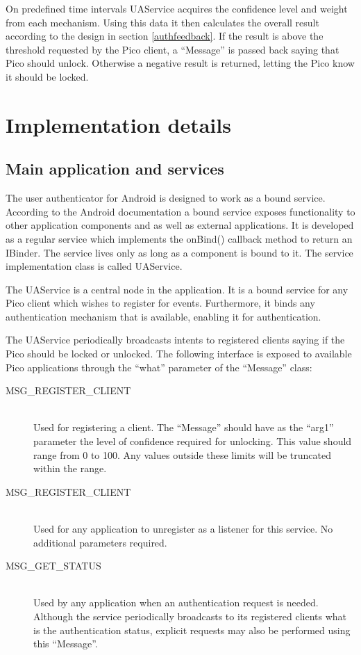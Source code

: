 On predefined time intervals UAService acquires the confidence level and weight from each mechanism. Using this data it then calculates the overall result according to the design in section \ref{authfeedback}. If the result is above the threshold requested by the Pico client, a ``Message'' is passed back saying that Pico should unlock. Otherwise a negative result is returned, letting the Pico know it should be locked. 

\section{Implementation details}

\subsection{Main application and services}
The user authenticator for Android is designed to work as a bound service. According to the Android documentation a bound service exposes functionality to other application components and as well as external applications. It is developed as a regular service which implements the onBind() callback method to return an IBinder. The service lives only as long as a component is bound to it. The service implementation class is called UAService.

The UAService is a central node in the application. It is a bound service for any Pico client which wishes to register for events. Furthermore, it binds any authentication mechanism that is available, enabling it for authentication. 

The UAService periodically broadcasts intents to registered clients saying if the Pico should be locked or unlocked. The following interface is exposed to available Pico applications through the ``what'' parameter of the ``Message'' class:
\begin{description}
  \item[MSG\_REGISTER\_CLIENT] \hfill \\
  Used for registering a client. The ``Message'' should have as the ``arg1'' parameter the level of confidence required for unlocking. This value should range from 0 to 100. Any values outside these limits will be truncated within the range.
  
  \item[MSG\_REGISTER\_CLIENT] \hfill \\
  Used for any application to unregister as a listener for this service. No additional parameters required.
  
  \item[MSG\_GET\_STATUS] \hfill \\
  Used by any application when an authentication request is needed. Although the service periodically broadcasts to its registered clients what is the authentication status, explicit requests may also be performed using this ``Message''.
\end{description}

